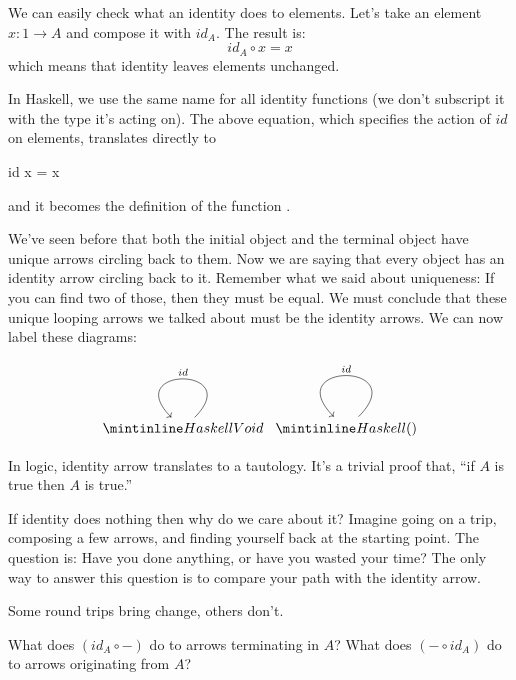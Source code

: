 \documentclass[DaoFP]{subfiles}
\begin{document}
We can easily check what an identity does to elements. Let's take an element $x \colon 1 \to A$ and compose it with $id_A$. The result is:
\[id_A \circ x = x\]
which means that identity leaves elements unchanged.

In Haskell, we use the same name  for all identity functions (we don't subscript it with the type it's acting on). The above equation, which specifies the action of $id$ on elements, translates directly to
\begin{haskell}
id x = x
\end{haskell}
and it becomes the definition of the function . 

We've seen before that both the initial object and the terminal object have unique arrows circling back to them. Now we are saying that every object has an identity arrow circling back to it. Remember what we said about uniqueness: If you can find two of those, then they must be equal. We must conclude that these unique looping arrows we talked about must be the identity arrows. We can now label these diagrams:

\[
 \begin{tikzcd}
 \hask{Void}
 \arrow[loop, "id"']
 \end{tikzcd}
 \begin{tikzcd}
 \hask{()}
 \arrow[loop, "id"']
 \end{tikzcd}
\]

In logic, identity arrow translates to a tautology. It's a trivial proof that, ``if $A$ is true then $A$ is true.''


If identity does nothing then why do we care about it? Imagine going on a trip, composing a few arrows, and finding yourself back at the starting point. The question is: Have you done anything, or have you wasted your time? The only way to answer this question is to compare your path with the identity arrow. 

Some round trips bring change, others don't.


\begin{exercise}\label{ex-yoneda-identity}
What does $(id_A \circ -)$ do to arrows terminating in $A$? What does $(- \circ id_A)$ do to arrows originating from $A$?
\end{exercise}
\end{document}

